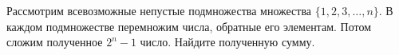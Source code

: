 \documentclass{article}
\begin{document}
Рассмотрим всевозможные непустые подмножества множества $\{1,2,3,\ldots, n\}$. В каждом подмножестве перемножим числа, 
обратные его элементам. Потом сложим полученное $2^n - 1$ число. Найдите полученную сумму.
\end{document}
